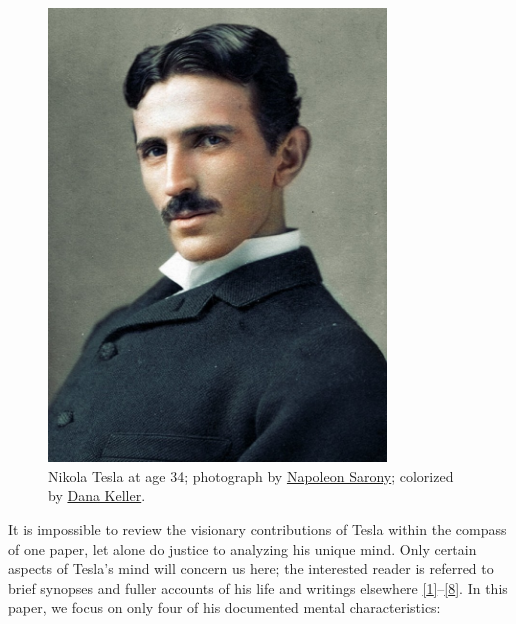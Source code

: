 \documentclass[
  a4paper,
]{article}
\begin{document}
\begin{figure}
\hypertarget{fig:tesla}{%
\centering
\includegraphics[width=0.8\textwidth,height=\textheight]{images/tesla_in_color.jpg}
\caption[Nikola Tesla at age 34; photograph by
\href{https://en.wikipedia.org/wiki/Napoleon_Sarony}{Napoleon Sarony};
colorized by \href{http://www.danarkeller.com/}{Dana Keller}.]{Nikola
Tesla at age 34; photograph by
\href{https://en.wikipedia.org/wiki/Napoleon_Sarony}{Napoleon Sarony};
colorized by \href{http://www.danarkeller.com/}{Dana
Keller}.\footnotemark{}}\label{fig:tesla}
}
\end{figure}

It is impossible to review the visionary contributions of Tesla within
the compass of one paper, let alone do justice to analyzing his unique
mind. Only certain aspects of Tesla's mind will concern us here; the
interested reader is referred to brief synopses and fuller accounts of
his life and writings elsewhere
\protect\hyperlink{ref-john83}{{[}1{]}}--\protect\hyperlink{ref-tesla-pbs-bio}{{[}8{]}}.
In this paper, we focus on only four of his documented mental
characteristics:
\end{document}
